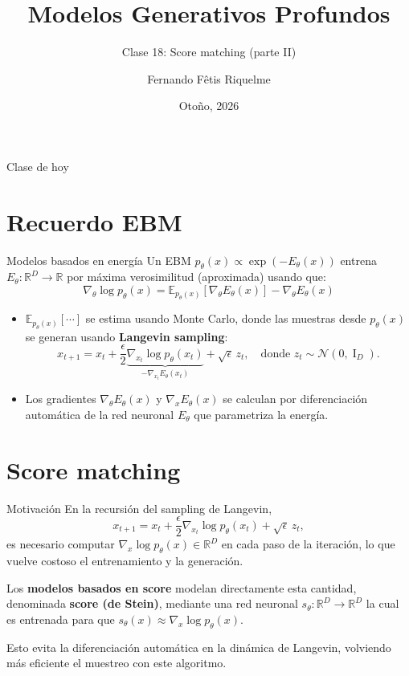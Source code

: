 \documentclass{beamer}
\title{Modelos Generativos Profundos}
\subtitle{Clase 18: Score matching (parte II)}
\author{Fernando Fêtis Riquelme}
\institute{
    Facultad de Ciencias Físicas y Matemáticas\\
    Universidad de Chile
}
\date{Otoño, 2026}
\newcommand{\R}{\mathbb{R}}
\begin{document}
\begin{frame}
    \titlepage
\end{frame}

\begin{frame}{Clase de hoy}
    \tableofcontents
\end{frame}

\section{Recuerdo EBM}

\begin{frame}{Modelos basados en energía}
    Un EBM $p_\theta(x)\propto\exp\left(-E_\theta(x)\right)$ entrena $E_\theta:\R^D\to\R$ por máxima verosimilitud (aproximada) usando que:
    \begin{equation*}
        \nabla_\theta\log p_\theta(x)=\mathbb{E}_{p_\theta(x)}\left[\nabla_\theta E_\theta(x)\right]-\nabla_\theta E_\theta(x)
    \end{equation*}
    \vspace{-0.8cm}
    \begin{itemize}
        \item $\mathbb{E}_{p_\theta(x)}[\cdots]$ se estima usando Monte Carlo, donde las muestras desde $p_\theta(x)$ se generan usando \textbf{Langevin sampling}:
              \begin{equation*}
                  x_{t+1} = x_t+\frac{\epsilon}{2} \underbrace{\nabla_{x_t} \log p_\theta(x_t)}_{-\nabla_{x_t} E_\theta(x_t)}+\sqrt{\epsilon}\, z_t,
                  \quad\text{donde }
                  z_t\sim\mathcal{N}(0,\operatorname{I}_D).
              \end{equation*}
        \item Los gradientes $\nabla_\theta E_\theta(x)$ y $\nabla_x E_\theta(x)$ se calculan por diferenciación automática de la red neuronal $E_\theta$ que parametriza la energía.
    \end{itemize}
\end{frame}

\section{Score matching}

\begin{frame}{Motivación}
    En la recursión del sampling de Langevin,
    \begin{equation*}
        x_{t+1} = x_t+\frac{\epsilon}{2} \nabla_{x_t} \log p_\theta(x_t) + \sqrt{\epsilon}\, z_t,
    \end{equation*}
    es necesario computar $\nabla_x \log p_\theta(x)\in\R^D$ en cada paso de la iteración, lo que vuelve costoso el entrenamiento y la generación.

    Los \textbf{modelos basados en score} modelan directamente esta cantidad, denominada \textbf{score (de Stein)}, mediante una red neuronal $s_\theta:\R^D\to\R^D$ la cual es entrenada para que $s_\theta(x)\approx\nabla_x\log p_\theta(x)$.

    Esto evita la diferenciación automática en la dinámica de Langevin, volviendo más eficiente el muestreo con este algoritmo.
\end{frame}
\end{document}
